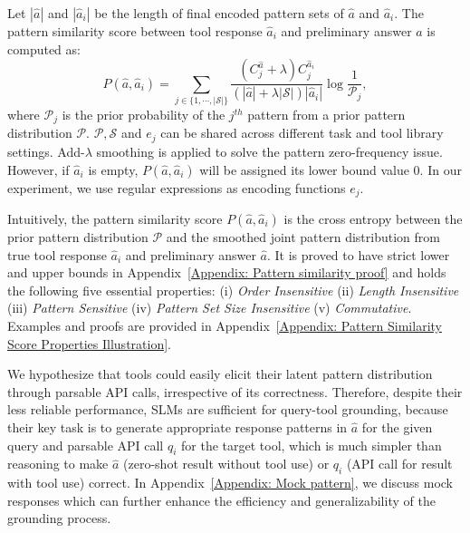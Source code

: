 \documentclass[11pt]{article}
\newcommand{\daniel}[1]{{\color{purple}[DK: #1]}}
\newcommand{\yining}[1]{{\color{ForestGreen}[YL: #1]}}
\newcommand{\slm}{\textcolor{darkblueTwo}{SLM}}
\newcommand{\calc}{{\tt Calculator}}
\newcommand{\mt}{{\tt MT}}
\newcommand{\wiki}{{\tt Wiki}}
\begin{document}
Let $|\hat{a}|$ and $|\hat{a}_i|$ be the length of final encoded pattern sets of $\hat{a}$ and $\hat{a}_i$. The pattern similarity score between tool response $\hat{a}_i$ and preliminary answer $\hat{a}$ is computed as:
$$
P(\hat{a}, \hat{a}_i) = \sum_{j\in \{1,\cdots,|\mathcal{S}|\}} \frac{(C_j^{\hat{a}} + \lambda)C_j^{\hat{a}_i}}{(|\hat{a}| + \lambda|\mathcal{S}|)|\hat{a}_i|}\log \frac{1}{\mathcal{P}_j},
$$
where $\mathcal{P}_j$ is the prior probability of the $j^{th}$ pattern from a prior pattern distribution $\mathcal{P}$. $\mathcal{P}, \mathcal{S}$ and $e_j$ can be shared across different task and tool library settings. Add-$\lambda$ smoothing is applied to solve the pattern zero-frequency issue. However, if $\hat{a}_i$ is empty, $P(\hat{a},\hat{a}_i)$ will be assigned its lower bound value 0. In our experiment, we use regular expressions as encoding functions $e_j$.

Intuitively, the pattern similarity score $P(\hat{a},\hat{a}_i)$ is the cross entropy between the prior pattern distribution $\mathcal{P}$ and the smoothed joint pattern distribution from true tool response $\hat{a}_i$ and preliminary answer $\hat{a}$. It is proved to have strict lower and upper bounds in Appendix~\ref{Appendix: Pattern similarity proof} and holds the following five essential properties: (i) \emph{Order Insensitive} (ii) \emph{Length Insensitive} (iii) \emph{Pattern Sensitive} (iv) \emph{Pattern Set Size Insensitive} (v) \emph{Commutative}. Examples and proofs are provided in Appendix~\ref{Appendix: Pattern Similarity Score Properties Illustration}. 


We hypothesize that tools could easily elicit their latent pattern distribution through parsable API calls, irrespective of its correctness. Therefore, despite their less reliable performance, \slm{}s are sufficient for query-tool grounding, because their key task is to generate appropriate response patterns in $\hat{a}$ for the given query and parsable API call $q_i$ for the target tool, which is much simpler than reasoning to make $\hat{a}$ (zero-shot result without tool use) or $q_i$ (API call for result with tool use) correct. In Appendix~\ref{Appendix: Mock pattern}, we discuss mock responses which can further enhance the efficiency and generalizability of the grounding process.
\end{document}
